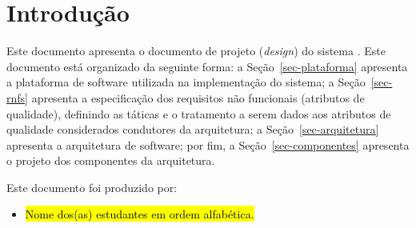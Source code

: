 \chapter{Introdução}
\label{sec-intro}
\vspace{-1cm}

Este documento apresenta o documento de projeto (\textit{design}) do sistema \emph{\imprimirtitulo}. Este documento está organizado da seguinte forma: 
	a Seção~\ref{sec-plataforma} apresenta a plataforma de software utilizada na implementação do sistema;
	a Seção~\ref{sec-rnfs} apresenta a especificação dos requisitos não funcionais (atributos de qualidade), definindo as táticas e o tratamento a serem dados aos atributos de qualidade considerados condutores da arquitetura; 
	a Seção~\ref{sec-arquitetura} apresenta a arquitetura de software; por fim, 
	a Seção~\ref{sec-componentes} apresenta o projeto dos componentes da arquitetura.

Este documento foi produzido por:
\begin{itemize}
	\item \hl{Nome dos(as) estudantes em ordem alfabética.}
\end{itemize}